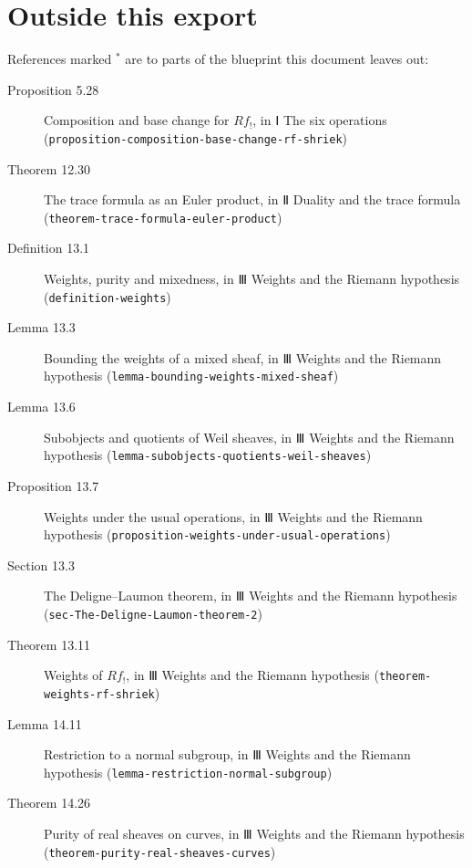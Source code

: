 \documentclass[11pt]{article}
\newcommand{\bpslug}[1]{\texttt{#1}}
\begin{document}
\section*{Outside this export}
References marked \ensuremath{{}^\ast} are to parts of the blueprint this document leaves out:
\begin{description}
\item[Proposition 5.28] Composition and base change for $Rf_!$, in Ⅰ The six operations (\bpslug{proposition-{}\allowbreak{}composition-{}\allowbreak{}base-{}\allowbreak{}change-{}\allowbreak{}rf-{}\allowbreak{}shriek})
\item[Theorem 12.30] The trace formula as an Euler product, in Ⅱ Duality and the trace formula (\bpslug{theorem-{}\allowbreak{}trace-{}\allowbreak{}formula-{}\allowbreak{}euler-{}\allowbreak{}product})
\item[Definition 13.1] Weights, purity and mixedness, in Ⅲ Weights and the Riemann hypothesis (\bpslug{definition-{}\allowbreak{}weights})
\item[Lemma 13.3] Bounding the weights of a mixed sheaf, in Ⅲ Weights and the Riemann hypothesis (\bpslug{lemma-{}\allowbreak{}bounding-{}\allowbreak{}weights-{}\allowbreak{}mixed-{}\allowbreak{}sheaf})
\item[Lemma 13.6] Subobjects and quotients of Weil sheaves, in Ⅲ Weights and the Riemann hypothesis (\bpslug{lemma-{}\allowbreak{}subobjects-{}\allowbreak{}quotients-{}\allowbreak{}weil-{}\allowbreak{}sheaves})
\item[Proposition 13.7] Weights under the usual operations, in Ⅲ Weights and the Riemann hypothesis (\bpslug{proposition-{}\allowbreak{}weights-{}\allowbreak{}under-{}\allowbreak{}usual-{}\allowbreak{}operations})
\item[Section 13.3] The Deligne–Laumon theorem, in Ⅲ Weights and the Riemann hypothesis (\bpslug{sec-{}\allowbreak{}The-{}\allowbreak{}Deligne-{}\allowbreak{}Laumon-{}\allowbreak{}theorem-{}\allowbreak{}2})
\item[Theorem 13.11] Weights of $Rf_!$, in Ⅲ Weights and the Riemann hypothesis (\bpslug{theorem-{}\allowbreak{}weights-{}\allowbreak{}rf-{}\allowbreak{}shriek})
\item[Lemma 14.11] Restriction to a normal subgroup, in Ⅲ Weights and the Riemann hypothesis (\bpslug{lemma-{}\allowbreak{}restriction-{}\allowbreak{}normal-{}\allowbreak{}subgroup})
\item[Theorem 14.26] Purity of real sheaves on curves, in Ⅲ Weights and the Riemann hypothesis (\bpslug{theorem-{}\allowbreak{}purity-{}\allowbreak{}real-{}\allowbreak{}sheaves-{}\allowbreak{}curves})

\end{description}
\end{document}
